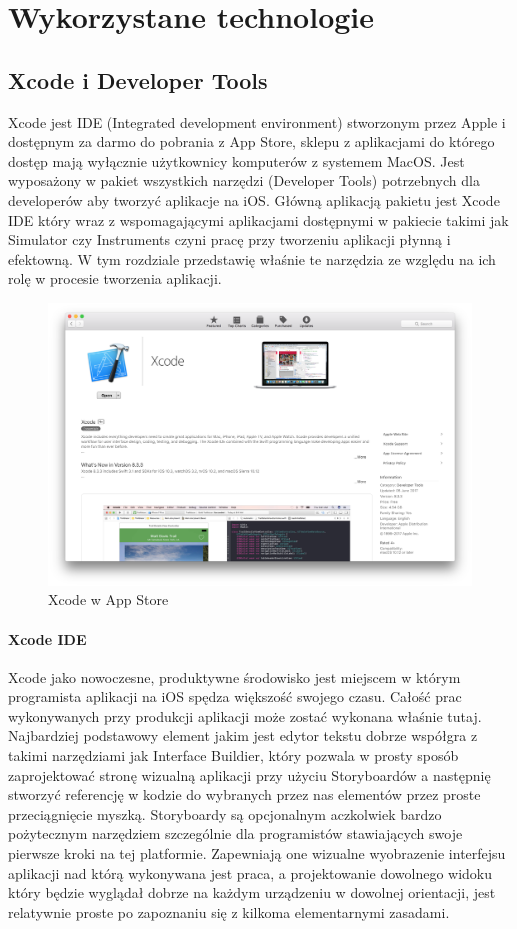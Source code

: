 \chapter{Wykorzystane technologie}

\section{Xcode i Developer Tools}
Xcode jest IDE (Integrated development environment) stworzonym przez Apple i dostępnym za darmo do pobrania z App Store, sklepu
z aplikacjami do którego dostęp mają wyłącznie użytkownicy komputerów z systemem MacOS. Jest wyposażony w pakiet wszystkich narzędzi
(Developer Tools) potrzebnych dla developerów aby tworzyć aplikacje na iOS. Główną aplikacją pakietu jest Xcode IDE który wraz z
wspomagającymi aplikacjami dostępnymi w pakiecie takimi jak Simulator czy Instruments czyni pracę przy tworzeniu aplikacji płynną
i efektowną. W tym rozdziale przedstawię właśnie te narzędzia ze względu na ich rolę w procesie tworzenia aplikacji.

\begin{figure}[ht!]
  \centering
  \includegraphics[width=120mm]{images/chapter-2-image-1-appstore.png}
  \caption{Xcode w App Store}
  \label{chapter-2-image-1-appstore}
\end{figure}

\subsubsection*{Xcode IDE}
Xcode jako nowoczesne, produktywne środowisko jest miejscem w którym programista aplikacji na iOS spędza większość swojego
czasu. Całość prac wykonywanych przy produkcji aplikacji może zostać wykonana właśnie tutaj. Najbardziej podstawowy element jakim
jest edytor tekstu dobrze współgra z takimi narzędziami jak Interface Buildier, który pozwala w prosty sposób zaprojektować stronę
wizualną aplikacji przy użyciu Storyboardów a następnię stworzyć referencję w kodzie do wybranych przez nas elementów przez proste
przeciągnięcie myszką. Storyboardy są opcjonalnym aczkolwiek bardzo pożytecznym narzędziem szczególnie dla programistów stawiających
swoje pierwsze kroki na tej platformie. Zapewniają one wizualne wyobrazenie interfejsu aplikacji nad którą wykonywana jest praca,
a projektowanie dowolnego widoku który będzie wyglądał dobrze na każdym urządzeniu w dowolnej orientacji, jest relatywnie proste po
zapoznaniu się z kilkoma elementarnymi zasadami.

